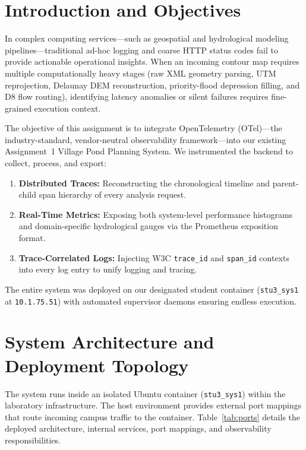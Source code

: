 \documentclass[manuscript,screen]{acmart}
\begin{document}
\section{Introduction and Objectives}
\label{sec:intro}

In complex computing services—such as geospatial and hydrological modeling pipelines—traditional ad-hoc logging and coarse HTTP status codes fail to provide actionable operational insights. When an incoming contour map requires multiple computationally heavy stages (raw XML geometry parsing, UTM reprojection, Delaunay DEM reconstruction, priority-flood depression filling, and D8 flow routing), identifying latency anomalies or silent failures requires fine-grained execution context.

The objective of this assignment is to integrate OpenTelemetry (OTel)—the industry-standard, vendor-neutral observability framework—into our existing Assignment~1 Village Pond Planning System. We instrumented the backend to collect, process, and export:
\begin{enumerate}
  \item \textbf{Distributed Traces:} Reconstructing the chronological timeline and parent-child span hierarchy of every analysis request.
  \item \textbf{Real-Time Metrics:} Exposing both system-level performance histograms and domain-specific hydrological gauges via the Prometheus exposition format.
  \item \textbf{Trace-Correlated Logs:} Injecting W3C \texttt{trace\_id} and \texttt{span\_id} contexts into every log entry to unify logging and tracing.
\end{enumerate}

The entire system was deployed on our designated student container (\texttt{stu3\_sys1} at \texttt{10.1.75.51}) with automated supervisor daemons ensuring endless execution.

\section{System Architecture and Deployment Topology}
\label{sec:arch}

The system runs inside an isolated Ubuntu container (\texttt{stu3\_sys1}) within the laboratory infrastructure. The host environment provides external port mappings that route incoming campus traffic to the container. Table~\ref{tab:ports} details the deployed architecture, internal services, port mappings, and observability responsibilities.
\end{document}
